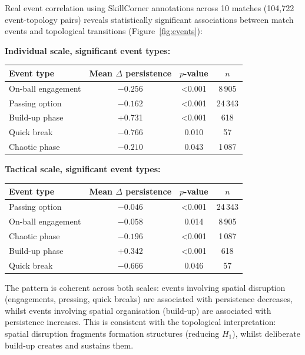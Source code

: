 Real event correlation using SkillCorner annotations across 10 matches (104,722 event-topology pairs) reveals statistically significant associations between match events and topological transitions (Figure~\ref{fig:events}):

\textbf{Individual scale, significant event types:}

\begin{table}[H]
  \centering
  \begin{tabular}{@{}lccc@{}}
    \toprule
    Event type & Mean \(\Delta\) persistence & \(p\)-value & \(n\) \\
    \midrule
    On-ball engagement & \(-0.256\) & \textless0.001 & 8\,905 \\
    Passing option     & \(-0.162\) & \textless0.001 & 24\,343 \\
    Build-up phase       & +0.731 & \textless0.001 & 618 \\
    Quick break          & \(-0.766\) & 0.010 & 57 \\
    Chaotic phase        & \(-0.210\) & 0.043 & 1\,087 \\
    \bottomrule
  \end{tabular}
\end{table}

\textbf{Tactical scale, significant event types:}

\begin{table}[H]
  \centering
  \begin{tabular}{@{}lccc@{}}
    \toprule
    Event type & Mean \(\Delta\) persistence & \(p\)-value & \(n\) \\
    \midrule
    Passing option     & \(-0.046\) & \textless0.001 & 24\,343 \\
    On-ball engagement & \(-0.058\) & 0.014 & 8\,905 \\
    Chaotic phase      & \(-0.196\) & \textless0.001 & 1\,087 \\
    Build-up phase     & +0.342 & \textless0.001 & 618 \\
    Quick break        & \(-0.666\) & 0.046 & 57 \\
    \bottomrule
  \end{tabular}
\end{table}

The pattern is coherent across both scales: events involving spatial disruption (engagements, pressing, quick breaks) are associated with persistence decreases, whilst events involving spatial organisation (build-up) are associated with persistence increases. This is consistent with the topological interpretation: spatial disruption fragments formation structures (reducing \(H_1\)), whilst deliberate build-up creates and sustains them.


